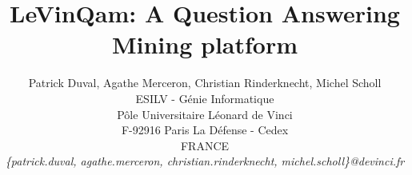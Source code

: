 \documentclass[10pt,twocolumn]{IEEEtran}
\begin{document}
\title{\LARGE \bf LeVinQam: A Question Answering Mining platform}

\author{
\large Patrick Duval, Agathe Merceron, Christian Rinderknecht, Michel Scholl \\ 
\normalsize ESILV - G\'enie Informatique\\ 
\normalsize P\^ole Universitaire L\'eonard de Vinci\\ 
\normalsize F-92916 Paris La D\'efense - Cedex \\
\normalsize FRANCE \\ 
\normalsize {\it \{patrick.duval, agathe.merceron, christian.rinderknecht, michel.scholl\}@devinci.fr}
}

\end{document}
